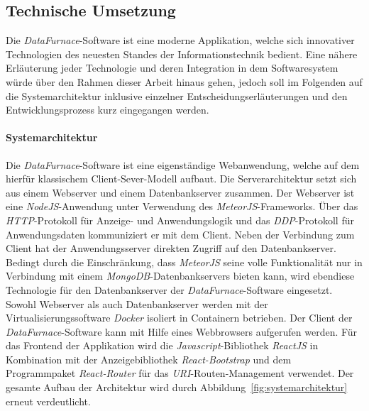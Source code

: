 \documentclass[
  language=german, %
  type=bachelor,%
  ngerman
]{isthesis}
\begin{document}
\begin{content}
  \section{Technische Umsetzung}


  Die \textit{DataFurnace}-Software ist eine moderne Applikation, welche sich
  innovativer Technologien des neuesten Standes der Informationstechnik
  bedient. Eine nähere Erläuterung jeder Technologie und deren
  Integration in dem Softwaresystem würde über den Rahmen dieser Arbeit hinaus
  gehen, jedoch soll im Folgenden auf die Systemarchitektur inklusive
  einzelner Entscheidungserläuterungen und den Entwicklungsprozess kurz
  eingegangen werden.


  \paragraph{Systemarchitektur}
  Die \textit{DataFurnace}-Software ist eine eigenständige  Webanwendung,
  welche auf dem hierfür klassischem Client-Sever-Modell aufbaut. Die
  Serverarchitektur setzt sich aus einem Webserver und einem Datenbankserver
  zusammen. Der Webserver ist eine \textit{NodeJS}-Anwendung unter Verwendung
  des \textit{MeteorJS}-Frameworks. Über das \textit{HTTP}-Protokoll für
  Anzeige- und Anwendungslogik und das \textit{DDP}-Protokoll für
  Anwendungsdaten kommuniziert er mit dem Client. Neben der Verbindung zum
  Client hat der Anwendungsserver direkten Zugriff auf den Datenbankserver.
  Bedingt durch die Einschränkung, dass \textit{MeteorJS} seine volle
  Funktionalität nur in Verbindung mit einem \textit{MongoDB}-Datenbankservers
  bieten kann, wird ebendiese Technologie für den Datenbankserver der
  \textit{DataFurnace}-Software eingesetzt. Sowohl Webserver als auch
  Datenbankserver werden mit der Virtualisierungssoftware \textit{Docker}
  isoliert in Containern betrieben.  Der Client der
  \textit{DataFurnace}-Software kann mit Hilfe eines Webbrowsers aufgerufen
  werden. Für das Frontend der Applikation wird die
  \textit{Javascript}-Bibliothek \textit{ReactJS} in Kombination mit der
  Anzeigebibliothek \textit{React-Bootstrap} und dem Programmpaket
  \textit{React-Router} für das \textit{URI}-Routen-Management verwendet.  Der
  gesamte Aufbau der Architektur wird durch
  Abbildung~\ref{fig:systemarchitektur} erneut verdeutlicht.


\end{content}
\end{document}
